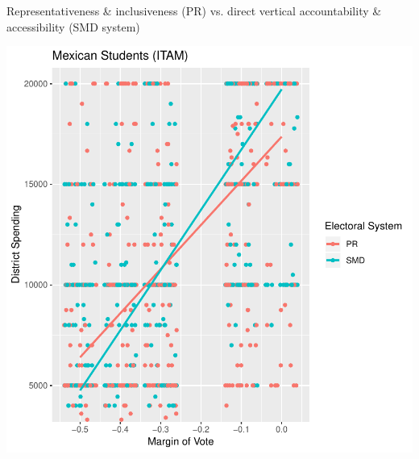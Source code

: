 \documentclass{article}
\begin{document}
Representativeness \& inclusiveness (PR) vs. direct vertical accountability \& accessibility (SMD system)

\fi



\includegraphics{Dilgin_MPSA-002}






\end{document}
